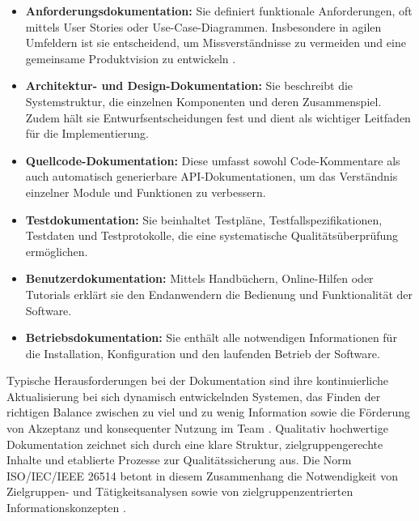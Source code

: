 \documentclass[12pt,oneside]{article}
\begin{document}
    \begin{itemize}
        \item \textbf{Anforderungsdokumentation:} Sie definiert funktionale Anforderungen, oft mittels User Stories oder Use-Case-Diagrammen. Insbesondere in agilen Umfeldern ist sie entscheidend, um Missverständnisse zu vermeiden und eine gemeinsame Produktvision zu entwickeln \cite{fraunhoferIESE2020}.
        \item \textbf{Architektur- und Design-Dokumentation:} Sie beschreibt die Systemstruktur, die einzelnen Komponenten und deren Zusammenspiel. Zudem hält sie Entwurfsentscheidungen fest und dient als wichtiger Leitfaden für die Implementierung.
        \item \textbf{Quellcode-Dokumentation:} Diese umfasst sowohl Code-Kommentare als auch automatisch generierbare API-Dokumentationen, um das Verständnis einzelner Module und Funktionen zu verbessern.
        \item \textbf{Testdokumentation:} Sie beinhaltet Testpläne, Testfallspezifikationen, Testdaten und Testprotokolle, die eine systematische Qualitätsüberprüfung ermöglichen.
        \item \textbf{Benutzerdokumentation:} Mittels Handbüchern, Online-Hilfen oder Tutorials erklärt sie den Endanwendern die Bedienung und Funktionalität der Software.
        \item \textbf{Betriebsdokumentation:} Sie enthält alle notwendigen Informationen für die Installation, Konfiguration und den laufenden Betrieb der Software.
    \end{itemize}
    Typische Herausforderungen bei der Dokumentation sind ihre kontinuierliche Aktualisierung bei sich dynamisch entwickelnden Systemen, das Finden der richtigen Balance zwischen zu viel und zu wenig Information sowie die Förderung von Akzeptanz und konsequenter Nutzung im Team \cite{webmakers2024}. Qualitativ hochwertige Dokumentation zeichnet sich durch eine klare Struktur, zielgruppengerechte Inhalte und etablierte Prozesse zur Qualitätssicherung aus. Die Norm ISO/IEC/IEEE 26514 betont in diesem Zusammenhang die Notwendigkeit von Zielgruppen- und Tätigkeitsanalysen sowie von zielgruppenzentrierten Informationskonzepten \cite{styrz2022normen}.
\end{document}
